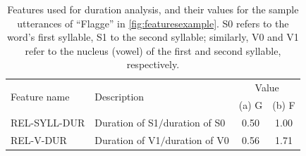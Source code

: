 \begin{table}%
		\centering
		\caption[Features used for duration analysis]{Features used for duration analysis, and their values for the sample utterances of ``Flagge'' in \cref{fig:featuresexample}. 
		S0 refers to the word's first syllable, S1 to the second syllable; similarly, V0 and V1 refer to the nucleus (vowel) of the first and second syllable, respectively.
		}
		
%
%		
		\begin{tabularx}{\textwidth}{lXcc}
		\toprule
		\multirow{2}{*}{Feature name} 
									& \multirow{2}{*}{Description}
														& \multicolumn{2}{c}{Value} \\
	&												&  (a) G		& (b) F \\
		\midrule
		REL-SYLL-DUR 	
			& Duration of S1$/$duration of S0
			& 	0.50		& 	1.00	\\
		REL-V-DUR 		
			& Duration of V1$/$duration of V0
			& 	0.56		& 	1.71	\\
		\bottomrule	
		\end{tabularx}
		\label{tab:durationfeatures}
\end{table}



